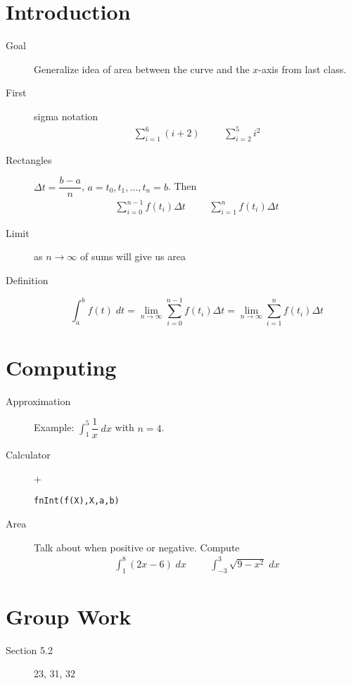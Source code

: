 \documentclass[11pt]{article}
\newcommand{\ds}{\displaystyle}
\begin{document}
\drawtitle

\section*{Introduction}
\begin{description}
\item[Goal] Generalize idea of area between the curve and the $x$-axis
  from last class.
\item[First] sigma notation
  \begin{align*}
    \sum_{i=1}^6 (i+2) &&& \sum_{i=2}^5 i^2
  \end{align*}
\item[Rectangles] $\Delta t=\dfrac{b-a}{n}$, $a=t_0,t_1,\dots, t_n=b$.
  Then
  \begin{align*}
    \sum_{i=0}^{n-1}f(t_i)\Delta t &&& \sum_{i=1}^{n}f(t_i)\Delta t
  \end{align*}
\item[Limit] as $n\to\infty$ of sums will give us area
\item[Definition]
  \[
  \int_{a}^{b}f(t)\;dt = \lim_{n\to\infty}\sum_{i=0}^{n-1}f(t_i)\Delta t
  = \lim_{n\to\infty}\sum_{i=1}^{n}f(t_i)\Delta t
  \]
\end{description}

\section*{Computing}
\begin{description}
\item[Approximation] Example: $\ds\int_{1}^{5}\dfrac{1}{x} \; dx$ with
  $n=4$.
\item[Calculator]  + 
  \begin{center}
    \verb#fnInt(f(X),X,a,b)#
  \end{center}
\item[Area] Talk about when positive or negative.  Compute
  \begin{align*}
    \int_1^8 (2x-6)\; dx &&& \int_{-3}^3 \sqrt{9-x^2}\; dx
  \end{align*}
\end{description}

\section*{Group Work}
\begin{description}
\item[Section 5.2] 23, 31, 32
\end{description}
\end{document}
